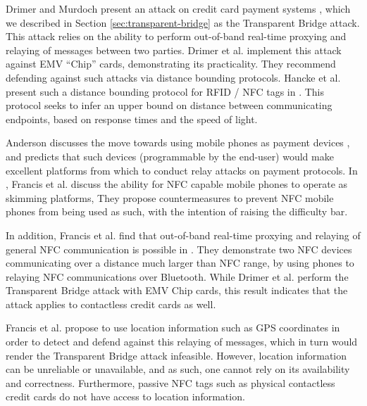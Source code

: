 
Drimer and Murdoch present an attack on credit card payment systems \cite{Drimer:2007:KYE:1362903.1362910},
    which we described in Section \ref{sec:transparent-bridge} as the Transparent Bridge attack.
This attack relies on the ability to perform out-of-band real-time proxying and relaying of messages between two parties.
Drimer et al. implement this attack against EMV ``Chip'' cards, demonstrating its practicality.
They recommend defending against such attacks via distance bounding protocols.
Hancke et al. present such a distance bounding protocol for RFID / NFC tags in \cite{hancke2005rfid}.
This protocol seeks to infer an upper bound on distance between communicating endpoints, based on response times and the speed of light.

Anderson discusses the move towards using mobile phones as payment devices \cite{anderson2007position},
    and predicts that such devices (programmable by the end-user) would make excellent platforms from which to conduct relay attacks on payment protocols.
In \cite{francis2010security}, Francis et al. discuss the ability for NFC capable mobile phones to operate as skimming platforms,
They propose countermeasures to prevent NFC mobile phones from being used as such, with the intention of raising the difficulty bar.

In addition, Francis et al. find that out-of-band real-time proxying and relaying of general NFC communication is possible in \cite{francis2010practical}.
They demonstrate two NFC devices communicating over a distance much larger than NFC range,
    by using phones to relaying NFC communications over Bluetooth.
While Drimer et al. perform the Transparent Bridge attack with EMV Chip cards,
    this result indicates that the attack applies to contactless credit cards as well.

Francis et al. propose to use location information such as GPS coordinates in order to detect and defend against this relaying of messages,
    which in turn would render the Transparent Bridge attack infeasible.
However, location information can be unreliable or unavailable, and as such, one cannot rely on its availability and correctness.
Furthermore, passive NFC tags such as physical contactless credit cards do not have access to location information.

